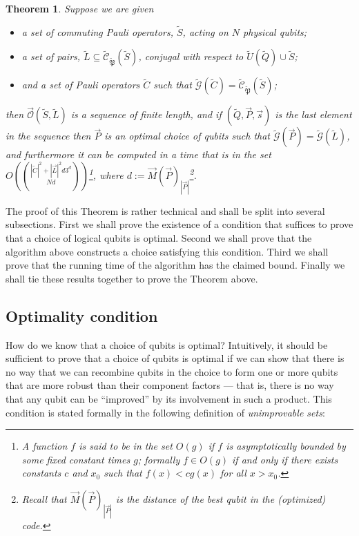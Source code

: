 \documentclass{amsbook}
\theoremstyle{plain}
\newtheorem{theorem}{Theorem}
\theoremstyle{definition}
\theoremstyle{remark}
\newcommand{\lst}{\vec}
\newcommand{\set}{\tilde}
\newcommand{\genfun}{\tilde{\mathcal{G}}}
\newcommand{\pauligroup}{{\set{\mathfrak{P}}}}
\newcommand{\centralizer}{\set{\mathcal{C}}}
\newcommand{\optimizer}{\lst{\mathcal{O}}}
\newcommand{\paren}[1]{\left(#1\right)}
\begin{document}
\begin{theorem}
\label{theorem:optimization procedure}
Suppose we are given
\begin{itemize}
\item a set of commuting Pauli operators, $\set S$, acting on $N$ physical qubits;
\item a set of pairs, $\set L\subseteq\centralizer_\pauligroup(\set S)$, conjugal with respect to $\set U(\set Q)\cup\set S$;
\item and a set of Pauli operators $\set C$ such that $\genfun(\set C)=\centralizer_\pauligroup(\set S)$;
\end{itemize}
then $\optimizer(\set S,\set L)$ is a sequence of finite length, and if $(\set Q,\lst P,\lst s)$ is the last element in the sequence then $\lst P$ is an optimal choice of qubits such that $\genfun(\lst P)=\genfun(\set L)$, and furthermore it can be computed in a time that is in the set $O\paren{|\set C|^2+|\lst L|^2d3^d\choose{N}{d}}$\footnote{A function $f$ is said to be in the set $O(g)$ if $f$ is asymptotically bounded by some fixed constant times $g$;  formally $f\in O(g)$ if and only if there exists constants $c$ and $x_0$ such that $f(x)<c g(x)$ for all $x>x_0$.}, where $d:=\lst M(\lst P)_{|\lst P|}$\footnote{Recall that $\lst M(\lst P)_{|\lst P|}$ is the distance of the best qubit in the (optimized) code.}.
\end{theorem}

The proof of this Theorem is rather technical and shall be split into several subsections.  First we shall prove the existence of a condition that suffices to prove that a choice of logical qubits is optimal.   Second we shall prove that the algorithm above constructs a choice satisfying this condition.  Third we shall prove that the running time of the algorithm has the claimed bound.  Finally we shall tie these results together to prove the Theorem above.

\subsection{Optimality condition}

\label{optimal-generators}

How do we know that a choice of qubits is optimal?  Intuitively, it should be sufficient to prove that a choice of qubits is optimal if we can show that there is no way that we can recombine qubits in the choice to form one or more qubits that are more robust than their component factors --- that is, there is no way that any qubit can be ``improved'' by its involvement in such a product.  This condition is stated formally in the following definition of \emph{unimprovable sets}:
\end{document}
